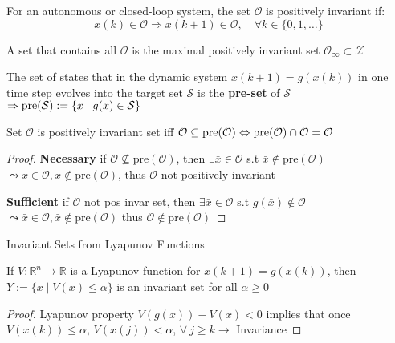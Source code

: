 

\begin{definition}
	For an autonomous or closed-loop system,
	the set $\mathcal{O}$ is positively invariant if:
	\[
		x(k)\in\mathcal{O}\Rightarrow
		x(k+1) \in \mathcal{O},
		\quad \forall k \in \{0,1,\dots\}
	\]
\end{definition}

\begin{definition}
	A set that contains all $\mathcal{O}$
	is the maximal positively invariant set
	$\mathcal{O}_\infty \subset \mathcal{X}$
\end{definition}

\begin{definition}
	The set of states that
	in the dynamic system $x(k+1) = g(x(k))$
	in one time step evolves into the target set $\mathcal{S}$
	is the \textbf{pre-set} of $\mathcal{S}$
	$\Rightarrow \operatorname{pre}(\mathcal{S}) := \{x\mid g(x)\in \mathcal{S}\}$
\end{definition}

\begin{theorem}
	Set $\mathcal{O}$ is positively invariant set iff
	$\mathcal{O}\subseteq\operatorname{pre}(\mathcal{O})
		\Leftrightarrow
		\operatorname{pre}(\mathcal{O})\cap\mathcal{O} = \mathcal{O}$
\end{theorem}
\begin{proof}
	\textbf{Necessary} if
	$\mathcal{O} \nsubseteq  \mathrm{pre}(\mathcal{O})$,
	then $\exists\bar{x} \in \mathcal{O}$
	s.t $\bar{x} \notin \mathrm{pre}(\mathcal{O})$
	$\leadsto \bar{x}\in\mathcal{O},
		\bar{x}\notin\mathrm{pre}(\mathcal{O})$,
	thus $\mathcal{O}$ not positively invariant

	\textbf{Sufficient} if
	$\mathcal{O}$ not pos invar set,
	then $\exists \bar{x}\in\mathcal{O}$
	s.t $g(\bar{x}) \notin\mathcal{O}$
	$\leadsto \bar{x}\in\mathcal{O},
		\bar{x}\notin\mathrm{pre}(\mathcal{O})$
	thus $\mathcal{O}\notin \mathrm{pre}(\mathcal{O})$
\end{proof}

\begin{lemma}{Invariant Sets from Lyapunov Functions}

	If $V:\mathbb{R}^n \to \mathbb{R}$ is a Lyapunov function
	for $x(k+1) = g(x(k))$, then
	$Y := \{x \mid V(x) \leq \alpha\}$
	is an invariant set for all $\alpha \geq 0$
\end{lemma}
\begin{proof}
	Lyapunov property $V(g(x)) - V(x) < 0$
	implies that once $V(x(k))\leq \alpha$,
	$V(x(j))<\alpha$,
	$\forall\ j\ge k \rightarrow$ Invariance
\end{proof}

